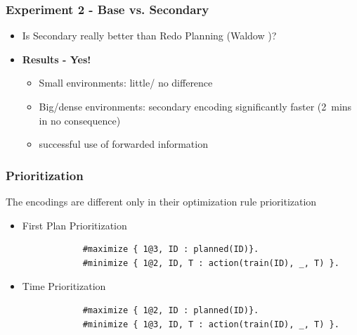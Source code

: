 \documentclass{beamer}
\begin{document}

\begin{frame}[fragile]
	\frametitle{Experiment 2 - Base vs. Secondary}
	\begin{itemize}
		\item Is Secondary really better than Redo Planning (Waldow \cite{waldow2025})?

		\vspace{1cm}
		\item \textbf{Results - Yes!}
		\begin{itemize}
			\item Small environments: little/ no difference
			\item Big/dense environments: secondary encoding significantly faster (2~mins in no consequence)
			\item[$\rightarrow$] successful use of forwarded information
		\end{itemize}
	\end{itemize}
	
\end{frame}

\begin{frame}[fragile]
	\frametitle{Prioritization}
	The encodings are different only in their optimization rule prioritization
	\begin{itemize}
		\item First Plan Prioritization
		\begin{verbatim}
			#maximize { 1@3, ID : planned(ID)}.
			#minimize { 1@2, ID, T : action(train(ID), _, T) }.\end{verbatim}
		\item Time Prioritization
		\begin{verbatim}
			#maximize { 1@2, ID : planned(ID)}.
			#minimize { 1@3, ID, T : action(train(ID), _, T) }.\end{verbatim}
	\end{itemize}
	
\end{frame}

\end{document}
